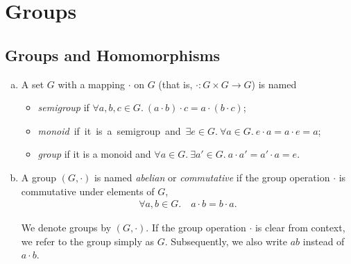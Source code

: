 
\chapter{Groups}\label{cha:groups}
\section{Groups and Homomorphisms}
\begin{defn}\leavevmode
\begin{enumerate}[(a),leftmargin=2\parindent]
    \item A set $G$ with a mapping $\cdot$ on $G$ (that is, $\cdot: G \times G \to G$) is named \begin{itemize}
        \item \emph{semigroup} if $\forall a, b, c \in G.\ (a \cdot b) \cdot c = a \cdot (b \cdot c)$; 
        \item \mbox{\emph{monoid} if it is a semigroup and $\exists e \in G.\ \forall a \in G.\ e \cdot a = a \cdot e = a$; }
        \item \emph{group} if it is a monoid and $\forall a \in G.\ \exists a' \in G.\ a \cdot a' = a' \cdot a = e$. 
    \end{itemize}
    
    \item A group $(G,\cdot)$ is named \emph{abelian} or \emph{commutative} if the group operation $\cdot$ is commutative under elements of $G$, \begin{align}
        \forall a, b \in G.\quad a \cdot b = b \cdot a.
    \end{align}
    
    \begin{marginfigure}
        We denote groups by $(G,\cdot)$. If the group operation $\cdot$ is clear from context, we refer to the group simply as $G$. Subsequently, we also write $a b$ instead of $a \cdot b$.
    \end{marginfigure}
\end{enumerate}
\end{defn}

